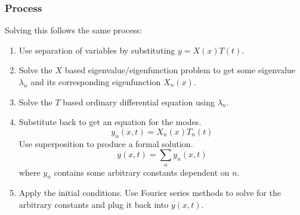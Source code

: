 \documentclass{math}
\begin{document}
\subsubsection*{Process}
Solving this follows the same process:
\begin{enumerate}
  \item Use separation of variables by substituting \( y = X(x)T(t) \).
  \item Solve the \( X \) based eigenvalue/eigenfunction problem to get
    some eigenvalue \( \lambda_n \) and its corresponding eigenfunction
    \( X_n(x) \).
  \item Solve the \( T \) based ordinary differential equation using
    \( \lambda_n \).
  \item Substitute back to get an equation for the modes.
  \[ y_n(x,t) = X_n(x)T_n(t) \]
  Use superposition to produce a formal solution.
  \[ y(x,t) = \sum_{n}y_n(x,t) \]
  where \( y_n \) contains some arbitrary constants dependent on \( n \).
  \item Apply the initial conditions. Use Fourier series methods to solve for
    the arbitrary constants and plug it back into \( y(x,t) \).
\end{enumerate}
\end{document}
